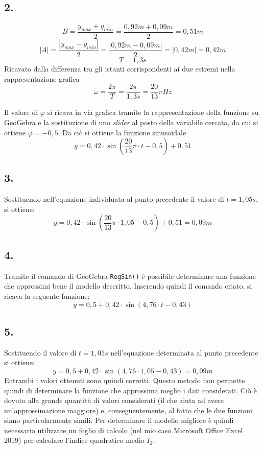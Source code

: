 \documentclass{article}     %
\begin{document}
\subsection*{2.}
    \[B = \frac{y_{max}+y_{min}}{2} = \frac{0,92 m+0,09 m}{2} = 0,51 m\]
    \[|A| = \frac{|y_{max}-y_{min}|}{2} = \frac{|0,92 m-0,09 m|}{2} = |0,42 m| = 0,42 m\]
    \[T = 1,3 s\] Ricavato dalla differenza tra gli istanti corrispondenti ai due estremi nella rappresentazione grafica
    \[\omega = \frac{2\pi}{T}=\frac{2\pi}{1,3s} = \frac{20}{13}\pi Hz\]
    
    Il valore di $\varphi$ si ricava in via grafica tramite la rappresentazione della funzione su GeoGebra e la sostituzione di uno \textit{slider} al posto della variabile cercata, da cui si ottiene $\varphi = -0,5$. 
    Da ciò si ottiene la funzione sinusoidale
    \[y=0,42 \cdot \sin \left( \frac{20}{13} \pi \cdot t -0,5 \right)+0,51 \]
\subsection*{3.}
    Sostituendo nell'equazione individuata al punto precedente il valore di $t=1,05s$, si ottiene:
    \[y=0,42 \cdot \sin \left( \frac{20}{13} \pi \cdot 1,05 -0,5 \right)+0,51 = 0,09m\]
\subsection*{4.}
    Tramite il comando di GeoGebra \texttt{RegSin()} è possibile determinare una funzione che approssimi bene il modello descritto. Inserendo quindi il comando citato, si ricava la seguente funzione:
    \[y=0,5+0,42\cdot\sin\left(4,76\cdot t-0,43\right)\]
    
\subsection*{5.}
    Sostituendo il valore di $t=1,05 s$ nell'equazione determinata al punto precedente si ottiene: 
    \[y=0,5+0,42\cdot\sin\left(4,76\cdot 1,05 -0,43\right)=0,09m\]
    Entrambi i valori ottenuti sono quindi corretti. Questo metodo non permette quindi di determinare la funzione che approssima meglio i dati considerati. Ciò è dovuto alla grande quantità di valori considerati (il che aiuta ad avere un'approssimazione maggiore) e, conseguentemente, al fatto che le due funzioni siano particolarmente simili. Per determinare il modello migliore è quindi necessario utilizzare un foglio di calcolo (nel mio caso Microsoft Office Excel 2019) per calcolare l'indice quadratico medio $I_2$.
    
\end{document}

